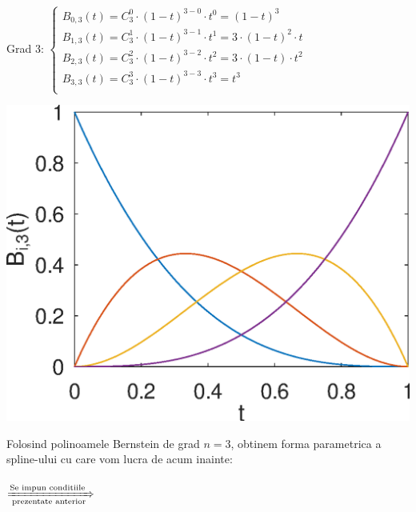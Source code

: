 \documentclass{article}
\begin{document}
\hspace{0.75cm}\begin{minipage}[b]{0.5\textwidth}
    Grad $3$:
    $\begin{cases}
      B_{0,3}(t) = C_3^0 \cdot (1-t)^{3-0} \cdot t^0 = (1-t)^3\\
      B_{1,3}(t) = C_3^1 \cdot (1-t)^{3-1} \cdot t^1 = 3 \cdot (1-t)^2 \cdot t\\
      B_{2,3}(t) = C_3^2 \cdot (1-t)^{3-2} \cdot t^2 = 3 \cdot (1-t) \cdot t^2\\
      B_{3,3}(t) = C_3^3 \cdot (1-t)^{3-3} \cdot t^3 = t^3\\
    \end{cases}$
    \begin{center}
        \includegraphics[scale=0.5]{bernstein_3}
    \end{center}
\end{minipage}

Folosind polinoamele Bernstein de grad $n = 3$, obtinem forma parametrica a spline-ului cu care vom lucra de acum inainte:\\

\\

$\xRightarrow[\text{prezentate anterior}]{\text{Se impun conditiile }}\;$
\end{document}
